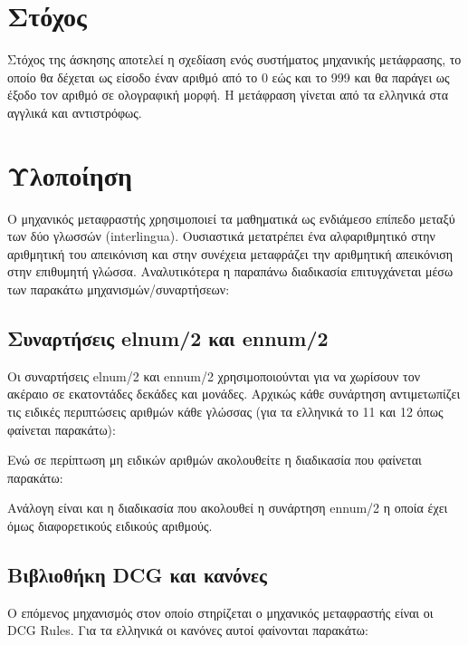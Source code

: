 \documentclass[a4paper,12pt]{article}
\begin{document}
\section{Στόχος}
Στόχος της άσκησης αποτελεί η σχεδίαση ενός συστήματος μηχανικής μετάφρασης, το οποίο θα δέχεται ως είσοδο έναν αριθμό από το 0 εώς και το 999 και θα παράγει ως έξοδο τον αριθμό σε ολογραφική μορφή. Η μετάφραση γίνεται από τα ελληνικά στα αγγλικά και αντιστρόφως. 
\section{Υλοποίηση}
Ο μηχανικός μεταφραστής χρησιμοποιεί τα μαθηματικά ως ενδιάμεσο επίπεδο μεταξύ των δύο γλωσσών (interlingua). Ουσιαστικά μετατρέπει ένα αλφαριθμητικό στην αριθμητική του απεικόνιση και στην συνέχεια μεταφράζει την αριθμητική απεικόνιση στην επιθυμητή γλώσσα. Αναλυτικότερα η παραπάνω διαδικασία επιτυγχάνεται μέσω των παρακάτω μηχανισμών/συναρτήσεων:
	\subsection{Συναρτήσεις elnum/2 και ennum/2}
	Οι συναρτήσεις elnum/2 και ennum/2 χρησιμοποιούνται για να χωρίσουν τον ακέραιο σε εκατοντάδες δεκάδες και μονάδες. Αρχικώς κάθε συνάρτηση αντιμετωπίζει τις ειδικές περιπτώσεις αριθμών κάθε γλώσσας (για τα ελληνικά το 11 και 12 όπως φαίνεται παρακάτω):

Ενώ σε περίπτωση μη ειδικών αριθμών ακολουθείτε η διαδικασία που φαίνεται παρακάτω:

Ανάλογη είναι και η διαδικασία που ακολουθεί η συνάρτηση ennum/2 η οποία έχει όμως διαφορετικούς ειδικούς αριθμούς.
	\subsection{Βιβλιοθήκη DCG και κανόνες}
	Ο επόμενος μηχανισμός στον οποίο στηρίζεται ο μηχανικός μεταφραστής είναι οι DCG Rules. Για τα ελληνικά οι κανόνες αυτοί φαίνονται παρακάτω:
 	 
		
\end{document}
